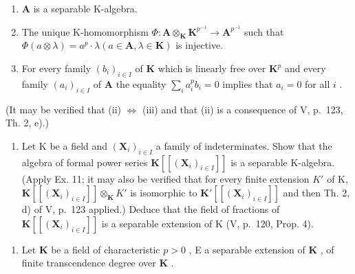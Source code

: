 \begin{enumerate}
\def\labelenumi{(\roman{enumi})}
\item
  \(\mathbf{A}\) is a separable K-algebra.
\item
  The unique K-homomorphism \(\Phi: \mathbf{A} \otimes_{\mathbf{K}} \mathbf{K}^{p^{-1}} \to \mathbf{A}^{p^{-1}}\) such that \(\Phi(a \otimes \lambda) = a^p \cdot \lambda (a \in \mathbf{A}, \lambda \in \mathbf{K})\) is injective.
\item
  For every family \((b_{i})_{i\in I}\) of \(\mathbf{K}\) which is linearly free over \(\mathbf{K}^p\) and every family \((a_{i})_{i\in I}\) of \(\mathbf{A}\) the equality \(\sum_{i}a_i^p b_i = 0\) implies that \(a_{i} = 0\) for all \(i\) .
\end{enumerate}

(It may be verified that (ii) \(\Leftrightarrow\) (iii) and that (ii) is a consequence of V, p.~123, Th. 2, e).)

\begin{enumerate}
\def\labelenumi{\arabic{enumi})}
\setcounter{enumi}{11}
\tightlist
\item
  Let K be a field and \((\mathbf{X}_{i})_{i\in I}\) a family of indeterminates. Show that the algebra of formal power series \(\mathbf{K}[[(\mathbf{X}_{i})_{i\in I}]]\) is a separable K-algebra. (Apply Ex. 11; it may also be verified that for every finite extension \(K'\) of K, \(\mathbf{K}[[(\mathbf{X}_{i})_{i\in I}]]\otimes_{\mathbf{K}}K'\) is isomorphic to \(\mathbf{K}'[[(\mathbf{X}_{i})_{i\in I}]]\) and then Th. 2, d) of V, p.~123 applied.) Deduce that the field of fractions of \(\mathbf{K}[[(\mathbf{X}_{i})_{i\in I}]]\) is a separable extension of K (V, p.~120, Prop. 4).
\end{enumerate}

\BourbakiExerciseGroup

\begin{enumerate}
\def\labelenumi{\arabic{enumi})}
\tightlist
\item
  Let \(\mathbf{K}\) be a field of characteristic \(p > 0\) , E a separable extension of \(\mathbf{K}\) , of finite transcendence degree over \(\mathbf{K}\) .
\end{enumerate}

